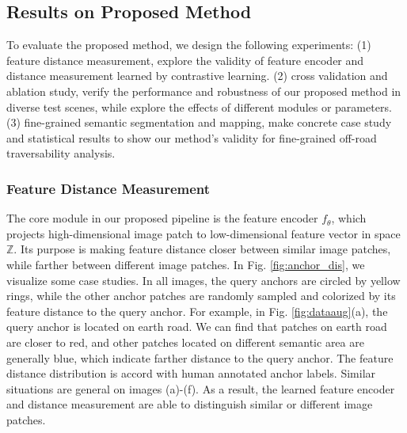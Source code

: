 \documentclass[letterpaper, 10 pt, conference]{ieeeconf}  %
\begin{document}
\subsection{Results on Proposed Method}
To evaluate the proposed method, we design the following experiments: (1) feature distance measurement, explore the validity of feature encoder and distance measurement learned by contrastive learning. (2) cross validation and ablation study, verify the performance and robustness of our proposed method in diverse test scenes, while explore the effects of different modules or parameters. (3) fine-grained semantic segmentation and mapping, make concrete case study and statistical results to show our method's validity for fine-grained off-road traversability analysis.


\subsubsection{Feature Distance Measurement}
The core module in our proposed pipeline is the feature encoder $f_\theta$, which projects high-dimensional image patch to low-dimensional feature vector in space $\mathbb{Z}$. Its purpose is making feature distance closer between similar image patches, while farther between different image patches. In Fig. \ref{fig:anchor_dis}, we visualize some case studies. In all images, the query anchors are circled by yellow rings, while the other anchor patches are randomly sampled and colorized by its feature distance to the query anchor. For example, in Fig. \ref{fig:dataaug}(a), the query anchor is located on earth road. We can find that patches on earth road are closer to red, and other patches located on different semantic area are generally blue, which indicate farther distance to the query anchor. The feature distance distribution is accord with human annotated anchor labels. Similar situations are general on images (a)-(f). As a result, the learned feature encoder and distance measurement are able to distinguish similar or different image patches.
\end{document}
